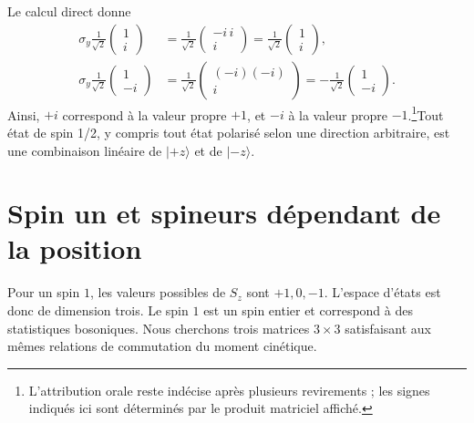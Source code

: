 \begin{classroomqa}\end{classroomqa}

Le calcul direct donne
\begin{align}
\sigma_y\frac{1}{\sqrt2}
\begin{pmatrix}
1\\
i
\end{pmatrix}
&=
\frac{1}{\sqrt2}
\begin{pmatrix}
-i\,i\\
i
\end{pmatrix}
=
\frac{1}{\sqrt2}
\begin{pmatrix}
1\\
i
\end{pmatrix},\\
\sigma_y\frac{1}{\sqrt2}
\begin{pmatrix}
1\\
-i
\end{pmatrix}
&=
\frac{1}{\sqrt2}
\begin{pmatrix}
(-i)(-i)\\
i
\end{pmatrix}
=
-\frac{1}{\sqrt2}
\begin{pmatrix}
1\\
-i
\end{pmatrix}.
\end{align}
Ainsi, \(+i\) correspond à la valeur propre \(+1\), et \(-i\) à la valeur propre \(-1\).\footnote{L’attribution orale reste indécise après plusieurs revirements ; les signes indiqués ici sont déterminés par le produit matriciel affiché.}Tout état de spin 1/2, y compris tout état polarisé selon une direction arbitraire, est une combinaison linéaire de \(|+z\rangle\) et de \(|-z\rangle\).

\section{Spin un et spineurs dépendant de la position}

Pour un spin \(1\), les valeurs possibles de \(S_z\) sont \(+1,0,-1\). L’espace d’états est donc de dimension trois. Le spin \(1\) est un spin entier et correspond à des statistiques bosoniques. Nous cherchons trois matrices \(3\times3\) satisfaisant aux mêmes relations de commutation du moment cinétique.

